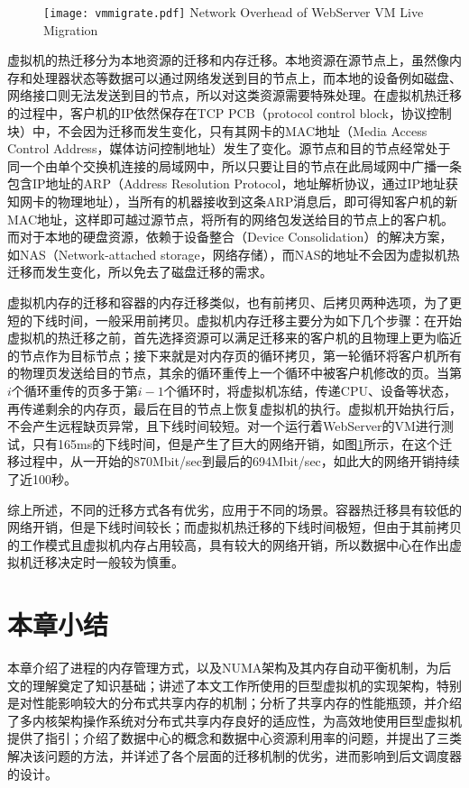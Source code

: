 \begin{figure}[!htp]
  \centering
  \texttt{[image: vmmigrate.pdf]}
    {Network Overhead of WebServer VM Live Migration}
  \label{fig:livem}
\end{figure}

虚拟机的热迁移\cite{livemigration}分为本地资源的迁移和内存迁移。本地资源在源节点上，虽然像内存和处理器状态等数据可以通过网络发送到目的节点上，而本地的设备例如磁盘、网络接口则无法发送到目的节点，所以对这类资源需要特殊处理。在虚拟机热迁移的过程中，客户机的IP依然保存在TCP PCB（protocol control block，协议控制块）中，不会因为迁移而发生变化，只有其网卡的MAC地址（Media Access Control Address，媒体访问控制地址）发生了变化。源节点和目的节点经常处于同一个由单个交换机连接的局域网中，所以只要让目的节点在此局域网中广播一条包含IP地址的ARP（Address Resolution Protocol，地址解析协议，通过IP地址获知网卡的物理地址），当所有的机器接收到这条ARP消息后，即可得知客户机的新MAC地址，这样即可越过源节点，将所有的网络包发送给目的节点上的客户机。而对于本地的硬盘资源，依赖于设备整合（Device Consolidation）的解决方案，如NAS（Network-attached storage，网络存储），而NAS的地址不会因为虚拟机热迁移而发生变化，所以免去了磁盘迁移的需求。

虚拟机内存的迁移和容器的内存迁移类似，也有前拷贝、后拷贝两种选项，为了更短的下线时间，一般采用前拷贝。虚拟机内存迁移主要分为如下几个步骤：在开始虚拟机的热迁移之前，首先选择资源可以满足迁移来的客户机的且物理上更为临近的节点作为目标节点；接下来就是对内存页的循环拷贝，第一轮循环将客户机所有的物理页发送给目的节点，其余的循环重传上一个循环中被客户机修改的页。当第$i$个循环重传的页多于第$i-1$个循环时，将虚拟机冻结，传递CPU、设备等状态，再传递剩余的内存页，最后在目的节点上恢复虚拟机的执行。虚拟机开始执行后，不会产生远程缺页异常，且下线时间较短。对一个运行着WebServer的VM进行测试，只有165ms的下线时间，但是产生了巨大的网络开销，如图\ref{fig:livem}所示，在这个迁移过程中，从一开始的870Mbit/sec到最后的694Mbit/sec，如此大的网络开销持续了近100秒\cite{livemigration}。

综上所述，不同的迁移方式各有优劣，应用于不同的场景。容器热迁移具有较低的网络开销，但是下线时间较长；而虚拟机热迁移的下线时间极短，但由于其前拷贝的工作模式且虚拟机内存占用较高，具有较大的网络开销，所以数据中心在作出虚拟机迁移决定时一般较为慎重。

\section{本章小结}
本章介绍了进程的内存管理方式，以及NUMA架构及其内存自动平衡机制，为后文的理解奠定了知识基础；讲述了本文工作所使用的巨型虚拟机的实现架构，特别是对性能影响较大的分布式共享内存的机制；分析了共享内存的性能瓶颈，并介绍了多内核架构操作系统对分布式共享内存良好的适应性，为高效地使用巨型虚拟机提供了指引；介绍了数据中心的概念和数据中心资源利用率的问题，并提出了三类解决该问题的方法，并详述了各个层面的迁移机制的优劣，进而影响到后文调度器的设计。